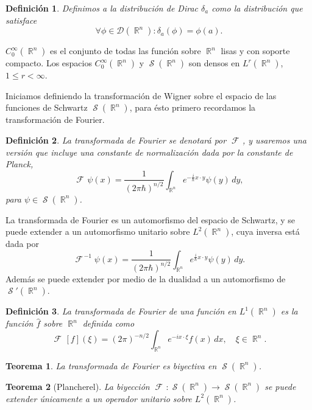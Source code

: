 \documentclass[a4paper]{report}
\DeclareMathOperator{\R}{\mathbb{R}}
\DeclareMathOperator{\Sz}{\mathcal S}
\DeclareMathOperator{\F}{\mathcal{F}\!}
\newtheorem{definition}{Definición}
\newtheorem{theorem}{Teorema}
\begin{document}
  \begin{definition}
    Definimos a la distribución de Dirac $\delta_a$ como la
    distribución que satisface
    \[
      \forall \phi \in \mathcal D(\R^{n}) : \delta_a(\phi) =
      \phi(a).
    \] 
  \end{definition}

  $C^{\infty}_0(\R^{n})$ es el conjunto de todas las función
  sobre $\R^{n}$ lisas y con soporte compacto. Los espacios
  $C^{\infty}_0(\R^{n})$ y $\Sz(\R^{n})$ son densos en
  $L^{r}(\R^{n})$, $1 \leq r < \infty$.

  Iniciamos definiendo
  la transformación de Wigner sobre el espacio de las
  funciones de Schwartz $\Sz(\R^{n})$, para ésto primero
  recordamos la transformación de Fourier.

  \begin{definition}
    La transformada de Fourier se denotará por $\F$,
    y usaremos una versión que incluye una constante de
    normalización dada por la constante de Planck,
    \[
      \F\psi(x)
      = \frac{1}{(2\pi\hbar)^{n / 2}} \int_{\R^{n}}
      e^{-\frac{i}{\hbar} x \cdot y} \psi(y) \, dy,
    \] 
    para $\psi \in \Sz(\R^{n})$.
  \end{definition}
  La transformada de Fourier es un automorfismo del espacio
  de Schwartz, y se puede extender a un automorfismo
  unitario sobre $L^2(\R^{n})$, cuya inversa está dada por
  \[
    \F^{-1}\psi(x)
    = \frac{1}{(2\pi\hbar)^{n / 2}} \int_{\R^{n}}
    e^{\frac{i}{\hbar} x \cdot y} \psi(y) \, dy.
  \] 
  Además se puede extender por medio de la dualidad a un
  automorfismo de $\Sz'(\R^{n})$.

  \begin{definition}
    La transformada de Fourier de una función en
    $L^{1}(\R^{n})$ es la función $\hat{f}$ sobre $\R^{n}$ 
    definida como
    \[
      \F[f](\xi) = (2\pi)^{-n / 2} \int_{\R^{n}} e^{-i x
      \cdot \xi} f(x) \, dx, 
      \quad \xi \in \R^{n}.
    \] 
  \end{definition}

  \begin{theorem}
    La transformada de Fourier es biyectiva en
    $\Sz(\R^{n})$.
  \end{theorem}

  \begin{theorem}[Plancherel]
    La biyección $\F : \Sz(\R^{n}) \to \Sz(\R^{n})$ 
    se puede extender únicamente a un operador unitario
    sobre $L^2(\R^{n})$.
  \end{theorem}
\end{document}
